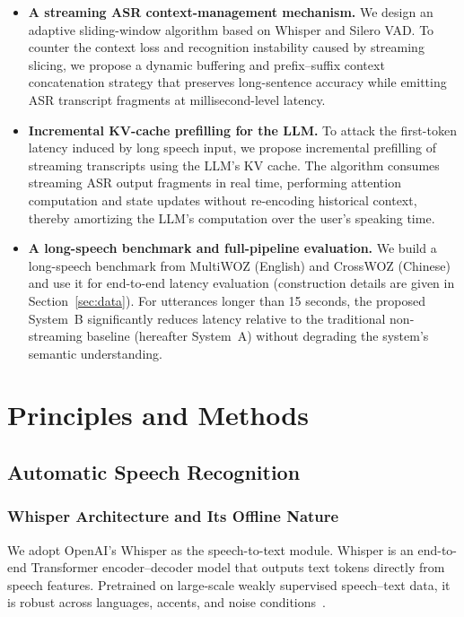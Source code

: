 \documentclass[pdflatex,iicol,Numbered,sn-basic]{sn-jnl}%
\begin{document}
\begin{itemize}
\item \textbf{A streaming ASR context-management mechanism.} We design an adaptive sliding-window algorithm based on Whisper and Silero VAD. To counter the context loss and recognition instability caused by streaming slicing, we propose a dynamic buffering and prefix--suffix context concatenation strategy that preserves long-sentence accuracy while emitting ASR transcript fragments at millisecond-level latency.

\item \textbf{Incremental KV-cache prefilling for the LLM.} To attack the first-token latency induced by long speech input, we propose incremental prefilling of streaming transcripts using the LLM's KV cache. The algorithm consumes streaming ASR output fragments in real time, performing attention computation and state updates without re-encoding historical context, thereby amortizing the LLM's computation over the user's speaking time.

\item \textbf{A long-speech benchmark and full-pipeline evaluation.} We build a long-speech benchmark from MultiWOZ (English) and CrossWOZ (Chinese) and use it for end-to-end latency evaluation (construction details are given in Section~\ref{sec:data}). For utterances longer than 15 seconds, the proposed System~B significantly reduces latency relative to the traditional non-streaming baseline (hereafter System~A) without degrading the system's semantic understanding.
\end{itemize}

\section{Principles and Methods}\label{sec:methods}

\subsection{Automatic Speech Recognition}

\subsubsection{Whisper Architecture and Its Offline Nature}

We adopt OpenAI's Whisper as the speech-to-text module. Whisper is an end-to-end Transformer encoder--decoder model that outputs text tokens directly from speech features. Pretrained on large-scale weakly supervised speech--text data, it is robust across languages, accents, and noise conditions~\cite{ref12}.
\end{document}
